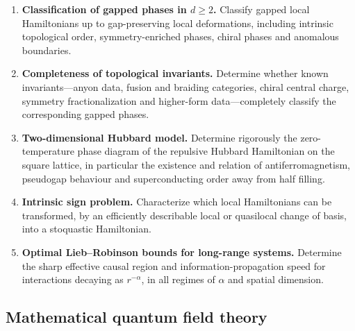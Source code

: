 \documentclass{article}
\begin{document}
\begin{enumerate}[label=\textbf{B\arabic*.},leftmargin=*]
\item \precise{} \textbf{Classification of gapped phases in \(d\geq2\).}
Classify gapped local Hamiltonians up to gap-preserving local
deformations, including intrinsic topological order, symmetry-enriched
phases, chiral phases and anomalous boundaries.

\item \precise{} \textbf{Completeness of topological invariants.}
Determine whether known invariants---anyon data, fusion and braiding
categories, chiral central charge, symmetry fractionalization and
higher-form data---completely classify the corresponding gapped phases.

\item \precise{} \textbf{Two-dimensional Hubbard model.}
Determine rigorously the zero-temperature phase diagram of the
repulsive Hubbard Hamiltonian on the square lattice, in particular the
existence and relation of antiferromagnetism, pseudogap behaviour and
superconducting order away from half filling.

\item \precise{} \textbf{Intrinsic sign problem.}
Characterize which local Hamiltonians can be transformed, by an
efficiently describable local or quasilocal change of basis, into a
stoquastic Hamiltonian.

\item \precise{} \textbf{Optimal Lieb--Robinson bounds for long-range systems.}
Determine the sharp effective causal region and information-propagation
speed for interactions decaying as \(r^{-\alpha}\), in all regimes of
\(\alpha\) and spatial dimension.

\end{enumerate}


\subsection{Mathematical quantum field theory}
\end{document}
